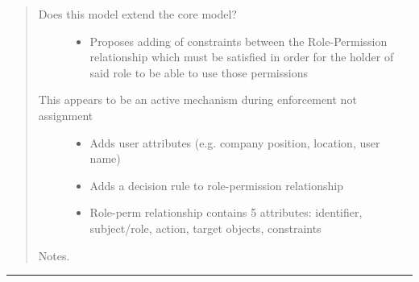 \documentclass[letterpaper,10pt,english]{sphinxmanual}
\begin{document}
\begin{quote}
\begin{description}
\item[{Does this model extend the core model?}] \leavevmode\begin{itemize}
\item {} 
Proposes adding of constraints between the Role-Permission relationship which must be satisfied in order for the holder of said role to be able to use those permissions

\end{itemize}

\item[{This appears to be an active mechanism during enforcement not assignment}] \leavevmode\begin{itemize}
\item {} 
Adds user attributes (e.g. company position, location, user name)

\item {} 
Adds a decision rule to role-permission relationship

\item {} 
Role-perm relationship contains 5 attributes: identifier, subject/role, action, target objects, constraints

\end{itemize}

\end{description}

Notes.
\end{quote}


\bigskip\hrule{}\bigskip
\end{document}
